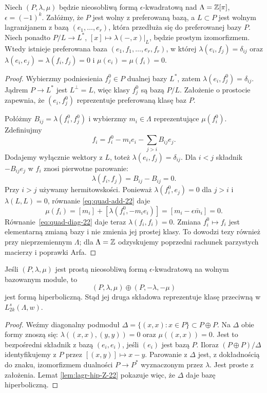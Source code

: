\begin{lemat}
\label{lem:lagr-hip-Z-22}
Niech $(P,\lambda,\mu)$ będzie nieosobliwą
formą $\epsilon$-kwadratową nad
$\Lambda=\mathbb{Z}[\pi]$, $\epsilon=(-1)^k$.
Załóżmy, że $P$ jest wolny z preferowaną bazą,
a $L\subset P$ jest wolnym lagranżjanem z bazą
$(e_1,\ldots,e_r)$, która przedłuża się do
preferowanej bazy $P$. Niech ponadto
$P/L\to L^*$, $[x]\mapsto\lambda(-,x)|_L$,
będzie prostym izomorfizmem.
Wtedy istnieje preferowana baza
$(e_1,f_1,\ldots,e_r,f_r)$, w której
$\lambda(e_i,f_j)=\delta_{ij}$ oraz
$\lambda(e_i,e_j)=\lambda(f_i,f_j)=0$ i
$\mu(e_i)=\mu(f_i)=0$.
\end{lemat}
\begin{proof}
Wybierzmy podniesienia $f_j^0\in P$ dualnej
bazy $L^*$, zatem
$\lambda(e_i,f_j^0)=\delta_{ij}$.
Jądrem $P\to L^*$ jest $L^\perp=L$,
więc klasy $f_j^0$ są bazą $P/L$.
Założenie o prostocie zapewnia, że
$(e_i,f_j^0)$ reprezentuje preferowaną
klasę baz $P$.

Połóżmy $B_{ij}=\lambda(f_i^0,f_j^0)$
i wybierzmy $m_i\in\Lambda$ reprezentujące
$\mu(f_i^0)$. Zdefiniujmy
\begin{equation}\label{eq:poprawka-lagr-Wall-22}
 f_i=f_i^0-m_i e_i-
       \sum_{j>i}B_{ij}e_j.
\end{equation}
Dodajemy wyłącznie wektory z $L$, toteż
$\lambda(e_i,f_j)=\delta_{ij}$.
Dla $i<j$ składnik $-B_{ij}e_j$ w $f_i$
znosi pierwotne parowanie:
\[
 \lambda(f_i,f_j)=B_{ij}-B_{ij}=0.
\]
Przy $i>j$ używamy hermitowskości.
Ponieważ $\lambda(f_i^0,e_j)=0$ dla $j>i$
i $\lambda(L,L)=0$, równanie
\eqref{eq:quad-add-22} daje
\[
 \mu(f_i)=[m_i]+[\lambda(f_i^0,-m_i e_i)]
   =[m_i-\epsilon\bar m_i]=0.
\]
Równanie~\eqref{eq:quad-diag-22} daje teraz
$\lambda(f_i,f_i)=0$.
Zmiana $f_i^0\mapsto f_i$ jest elementarną
zmianą bazy i nie zmienia jej prostej klasy.
To dowodzi tezy również przy nieprzemiennym
$\Lambda$; dla $\Lambda=\mathbb{Z}$ odzyskujemy
poprzedni rachunek parzystych macierzy
i poprawki Arfa.
\end{proof}

\begin{stwierdzenie}
\label{prop:odwrotna-forma-Wall-22}
Jeśli $(P,\lambda,\mu)$ jest prostą
nieosobliwą formą $\epsilon$-kwadratową
na wolnym bazowanym module, to
\[
 (P,\lambda,\mu)\oplus(P,-\lambda,-\mu)
\]
jest formą hiperboliczną. Stąd jej druga
składowa reprezentuje klasę przeciwną
w $L^s_{2k}(\Lambda,w)$.
\end{stwierdzenie}
\begin{proof}
Weźmy diagonalny podmoduł
$\Delta=\{(x,x):x\in P\}\subset P\oplus P$.
Na $\Delta$ obie formy znoszą się:
$\lambda((x,x),(y,y))=0$ oraz
$\mu((x,x))=0$. Jest to bezpośredni
składnik z bazą $(e_i,e_i)$, jeśli
$(e_i)$ jest bazą $P$. Iloraz
$(P\oplus P)/\Delta$ identyfikujemy
z $P$ przez $[(x,y)]\mapsto x-y$.
Parowanie z $\Delta$ jest, z dokładnością
do znaku, izomorfizmem dualności
$P\to P^*$ wyznaczonym przez $\lambda$.
Jest proste z założenia. Lemat
\ref{lem:lagr-hip-Z-22} pokazuje więc,
że $\Delta$ daje bazę hiperboliczną.
\end{proof}

